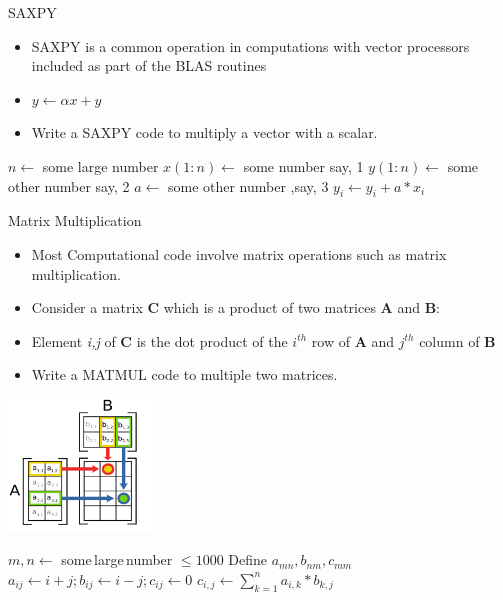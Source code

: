 \documentclass[10pt,t]{beamer}
\begin{document}
\begin{frame}{SAXPY}
  \begin{itemize}
    \item SAXPY is a common operation in computations with vector processors included as part of the BLAS routines
    \item[] $y\leftarrow \alpha x + y$
    \item Write a SAXPY code to multiply a vector with a scalar.
  \end{itemize}
  \begin{algorithm}[H]
    \caption{Pseudo Code for SAXPY}
    \begin{algorithmic}
      \State $n \gets$ some large number
      \State $x(1:n) \gets$ some number say, 1
      \State $y(1:n) \gets$ some other number say, 2
      \State $a \gets$ some other number ,say, 3
      \State $y_i \gets y_i + a * x_i$
      \EndDo
    \end{algorithmic}
  \end{algorithm}
\end{frame}

\begin{frame}[allowframebreaks]{Matrix Multiplication}
  \begin{itemize}
    \item Most Computational code involve matrix operations such as matrix multiplication.
    \item Consider a matrix {\bf C} which is a product of two matrices {\bf A} and {\bf B}:
    \item[] Element {\it i,j} of {\bf C} is the dot product of the $i^{th}$ row of {\bf A} and $j^{th}$ column of {\bf B}
    \item Write a MATMUL code to multiple two matrices.
  \end{itemize}
  \begin{center}
    \includegraphics[width=0.3\textwidth]{./matmul}
  \end{center}

  \begin{algorithm}[H]
    \caption{Pseudo Code for MATMUL}
    \begin{algorithmic}
      \State $m,n \gets$ some\,large\,number $\le 1000$
      \State Define $a_{mn}, b_{nm}, c_{mm}$
      \State $a_{ij} \gets i+j; b_{ij} \gets i-j; c_{ij} \gets 0$
      \State $c_{i,j} \gets \sum^{n}_{k=1} a_{i,k}*b_{k,j}$
      \EndDo
      \EndDo
    \end{algorithmic}
  \end{algorithm}
\end{frame}
\end{document}
